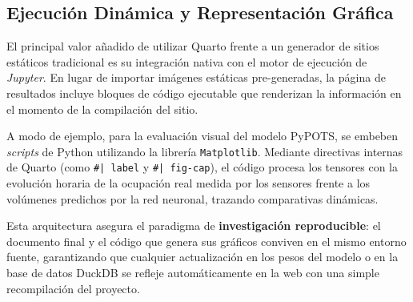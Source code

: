 \subsection{Ejecución Dinámica y Representación Gráfica}
\label{subsec:quarto_dinamico}

El principal valor añadido de utilizar Quarto frente a un generador de sitios estáticos tradicional es su integración nativa con el motor de ejecución de \textit{Jupyter}. En lugar de importar imágenes estáticas pre-generadas, la página de resultados incluye bloques de código ejecutable que renderizan la información en el momento de la compilación del sitio.

A modo de ejemplo, para la evaluación visual del modelo PyPOTS, se embeben \textit{scripts} de Python utilizando la librería \texttt{Matplotlib}. Mediante directivas internas de Quarto (como \texttt{\#| label} y \texttt{\#| fig-cap}), el código procesa los tensores con la evolución horaria de la ocupación real medida por los sensores frente a los volúmenes predichos por la red neuronal, trazando comparativas dinámicas. 

Esta arquitectura asegura el paradigma de \textbf{investigación reproducible}: el documento final y el código que genera sus gráficos conviven en el mismo entorno fuente, garantizando que cualquier actualización en los pesos del modelo o en la base de datos DuckDB se refleje automáticamente en la web con una simple recompilación del proyecto.


